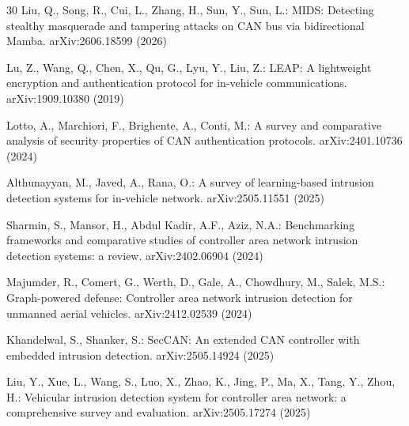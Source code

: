 \documentclass[runningheads]{llncs}
\begin{document}
\begin{thebibliography}{30}
Liu, Q., Song, R., Cui, L., Zhang, H., Sun, Y., Sun, L.: MIDS: Detecting stealthy masquerade and tampering attacks on CAN bus via bidirectional Mamba. arXiv:2606.18599 (2026)

Lu, Z., Wang, Q., Chen, X., Qu, G., Lyu, Y., Liu, Z.: LEAP: A lightweight encryption and authentication protocol for in-vehicle communications. arXiv:1909.10380 (2019)

Lotto, A., Marchiori, F., Brighente, A., Conti, M.: A survey and comparative analysis of security properties of CAN authentication protocols. arXiv:2401.10736 (2024)

Althunayyan, M., Javed, A., Rana, O.: A survey of learning-based intrusion detection systems for in-vehicle network. arXiv:2505.11551 (2025)

Sharmin, S., Mansor, H., Abdul Kadir, A.F., Aziz, N.A.: Benchmarking frameworks and comparative studies of controller area network intrusion detection systems: a review. arXiv:2402.06904 (2024)

Majumder, R., Comert, G., Werth, D., Gale, A., Chowdhury, M., Salek, M.S.: Graph-powered defense: Controller area network intrusion detection for unmanned aerial vehicles. arXiv:2412.02539 (2024)

Khandelwal, S., Shanker, S.: SecCAN: An extended CAN controller with embedded intrusion detection. arXiv:2505.14924 (2025)

Liu, Y., Xue, L., Wang, S., Luo, X., Zhao, K., Jing, P., Ma, X., Tang, Y., Zhou, H.: Vehicular intrusion detection system for controller area network: a comprehensive survey and evaluation. arXiv:2505.17274 (2025)

\end{thebibliography}
\end{document}
